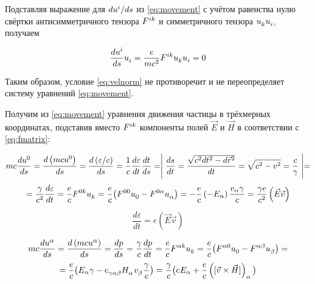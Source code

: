 \documentclass{article}
\begin{document}
Подставляя выражение для $d\tensor{u}{^i}/ds$ из \eqref{eq:movement} с учётом равенства нулю свёртки антисимметричного тензора $\tensor{F}{^i^k}$ и симметричного тензора $\tensor{u}{_k}\tensor{u}{_i}$, получаем

\begin{equation*}
    \frac{d\tensor{u}{^i}}{ds}\tensor{u}{_i}=\frac{e}{mc^2}\tensor{F}{^i^k}\tensor{u}{_k}\tensor{u}{_i}=0 
\end{equation*}

Таким образом, условие \eqref{eq:velnorm} не противоречит и не переопределяет систему уравнений \eqref{eq:movement}.

Получим из \eqref{eq:movement} уравнения движения частицы в трёхмерных координатах, подставив вместо $\tensor{F}{^i^k}$ компоненты полей $\vec{E}$ и $\vec{H}$ в соответствии с \eqref{eq:fmatrix}:

\begin{equation*}
    mc\frac{d\tensor{u}{^0}}{ds}=\frac{d\left(mc\tensor{u}{^0}\right)}{ds}=\frac{d\left(\varepsilon/c\right)}{ds}=\frac{1}{c}\frac{d\varepsilon}{dt}\frac{dt}{ds}=\Biggm\lvert\frac{ds}{dt}=\frac{\sqrt{c^2dt^2-d\vec{r}^2}}{dt}=\sqrt{c^2-v^2}=\frac{c}{\gamma}\Biggm\rvert=
\end{equation*}
\begin{equation*}
    =\frac{\gamma}{c^2}\frac{d\varepsilon}{dt}=\frac{e}{c}\tensor{F}{^0^k}\tensor{u}{_k}=\frac{e}{c}\big(\tensor{F}{^0^0}\tensor{u}{_0}-\tensor{F}{^0^\alpha}\tensor{u}{_\alpha}\big)    =-\frac{e}{c}\left(-E_\alpha\right)\frac{v_\alpha\gamma}{c}=\frac{\gamma e}{c^2}\left(\vec{E}\vec{v}\right)
\end{equation*}

\begin{equation}\label{eq:emovement}
    \frac{d\varepsilon}{dt}=e\left(\vec{E}\vec{v}\right)
\end{equation}

\begin{equation*}
    mc\frac{d\tensor{u}{^\alpha}}{ds}=\frac{d\left(mc\tensor{u}{^\alpha}\right)}{ds}=\frac{dp}{ds}=\frac{\gamma}{c}\frac{dp}{dt}=\frac{e}{c}\tensor{F}{^\alpha^k}\tensor{u}{_k}=\frac{e}{c}\big(\tensor{F}{^\alpha^0}\tensor{u}{_0}-\tensor{F}{^\alpha^\beta}\tensor{u}{_\beta}\big)=
\end{equation*}
\begin{equation*}
    =\frac{e}{c}\big(E_\alpha\gamma-\tensor{e}{_\gamma_\alpha_\beta}\tensor{H}{_\alpha}\tensor{v}{_\beta}\frac{\gamma}{c}\big)=\frac{\gamma}{c}\big(eE_\alpha+\frac{e}{c}\left(\lbrack\vec{v}\times\vec{H}\rbrack\right)_\alpha\big)
\end{equation*}
\end{document}
